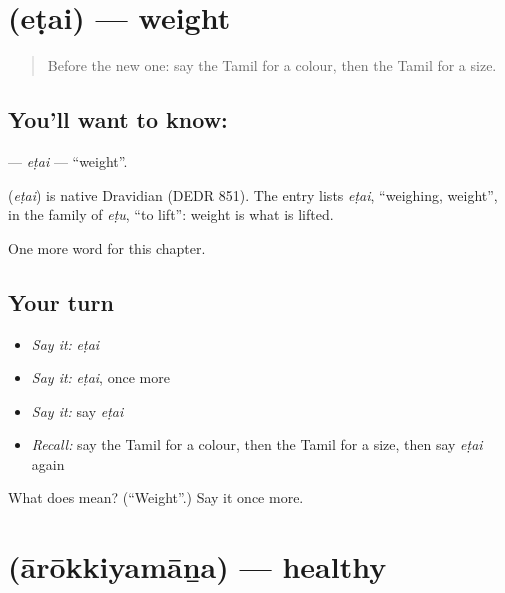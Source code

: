 \section[\texorpdfstring{\ta{எடை} (eṭai)}{எடை (eṭai)}]{ (eṭai) — weight}

\label{lesson:TA-C238-etai}



\begin{quote}
Before the new one: say the Tamil for a colour, then the Tamil for a size.
\end{quote}

\subsection*{You'll want to know: }
\textbf{} — \emph{eṭai} — \textquotedblleft{}weight\textquotedblright{}.

\begin{cousinweb}
\textbf{} (\emph{eṭai}) is native Dravidian (DEDR 851). The entry lists \emph{eṭai}, \textquotedblleft{}weighing, weight\textquotedblright{}, in the family of \emph{eṭu}, \textquotedblleft{}to lift\textquotedblright{}: weight is what is lifted.
\end{cousinweb}

\begin{grammarlens}[title={What you've built}]
One more word for this chapter.
\end{grammarlens}

\subsection*{Your turn}
\begin{itemize}
\raggedright
  \item \emph{Say it:} \emph{eṭai}
  \item \emph{Say it:} \emph{eṭai}, once more
  \item \emph{Say it:} say \emph{eṭai}
  \item \emph{Recall:} say the Tamil for a colour, then the Tamil for a size, then say \emph{eṭai} again
\end{itemize}

\begin{tcolorbox}[breakable,colback=teal!4,colframe=teal!35!black,title={Before you move on}]
What does  mean? (\textquotedblleft{}Weight\textquotedblright{}.) Say it once more.
\end{tcolorbox}
\section[\texorpdfstring{\ta{ஆரோக்கியமான} (ārōkkiyamāṉa)}{ஆரோக்கியமான (ārōkkiyamāṉa)}]{ (ārōkkiyamāṉa) — healthy}

